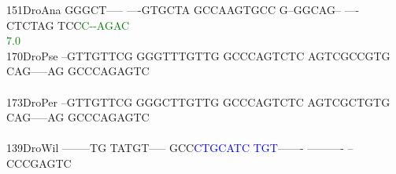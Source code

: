 \documentclass[11pt,twoside,reqno,a4paper]{article}
\begin{document}
{151\hspace*{1\charwidth}DroAna	GGGCT-----	----GTGCTA	GCCAAGTGCC	G--GGCAG--	----CTCTAG	TCC\textcolor{Green}{C}\textcolor{Green}{-}\textcolor{Green}{-}\textcolor{Green}{A}\textcolor{Green}{G}\textcolor{Green}{A}\textcolor{Green}{C}	\\
\hspace*{4\charwidth}\hspace*{7\charwidth}\hspace*{1\charwidth}\hspace*{1\charwidth}\hspace*{1\charwidth}\hspace*{1\charwidth}\hspace*{1\charwidth}\hspace*{53\charwidth}\textcolor{Green}{7.0}\hspace*{1\charwidth}\\
170\hspace*{1\charwidth}DroPse	--GTTGTTCG	GGGTTTGTTG	GCCCAGTCTC	AGTCGCCGTG	CAG-----AG	GCCCAGAGTC	\\
\hspace*{4\charwidth}\hspace*{7\charwidth}\hspace*{1\charwidth}\hspace*{1\charwidth}\hspace*{1\charwidth}\hspace*{1\charwidth}\hspace*{1\charwidth}\hspace*{1\charwidth}\\
173\hspace*{1\charwidth}DroPer	--GTTGTTCG	GGGCTTGTTG	GCCCAGTCTC	AGTCGCTGTG	CAG-----AG	GCCCAGAGTC	\\
\hspace*{4\charwidth}\hspace*{7\charwidth}\hspace*{1\charwidth}\hspace*{1\charwidth}\hspace*{1\charwidth}\hspace*{1\charwidth}\hspace*{1\charwidth}\hspace*{1\charwidth}\\
139\hspace*{1\charwidth}DroWil	--------TG	TATGT-----	GCC\textcolor{Blue}{C}\textcolor{Blue}{T}\textcolor{Blue}{G}\textcolor{Blue}{C}\textcolor{Blue}{A}\textcolor{Blue}{T}\textcolor{Blue}{C}	\textcolor{Blue}{T}\textcolor{Blue}{G}\textcolor{Blue}{T}-------	----------	--CCCGAGTC	\\
}
\end{document}
